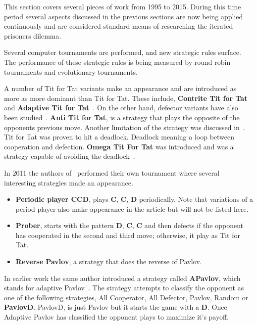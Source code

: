 \documentclass{article}
\begin{document}
This section covers several pieces of work from 1995 to 2015. During this time
period several aspects discussed in the previous sections are now being applied
continuously and are considered standard means of researching the iterated
prisoners dilemma.

Several computer tournaments are performed, and new strategic rules surface.
The performance of these strategic rules is being measured by round robin tournaments
and evolutionary tournaments.
 
A number of Tit for Tat variants make an appearance and are introduced as more
as more dominant than Tit for Tat. These include, \textbf{Contrite Tit for Tat}
\cite{Wu1995} and \textbf{Adaptive Tit for Tat}~\cite{tzafestas-2000a}.
On the other hand, defector variants have also been studied~\cite{Hilde2013}.
\textbf{Anti Tit for Tat}, is a strategy that plays the opposite of the opponents
previous move. Another limitation of the strategy was discussed in~\cite{Wolfgang2006}.
Tit for Tat was proven to hit a deadlock. Deadlock meaning a loop between 
cooperation and defection. \textbf{Omega Tit For Tat} was introduced and was
a strategy capable of avoiding the deadlock~\cite{Wolfgang2006}.

In 2011 the authors of~\cite{Li2011} performed their own tournament where 
several interesting strategies made an appearance.

\begin{itemize}
    \item \textbf{Periodic player CCD}, plays \textbf{C}, \textbf{C}, \textbf{D} 
    periodically. Note that variations of a period player also make appearance
    in the article but will not be listed here.
    \item \textbf{Prober}, starts with the pattern \textbf{D}, \textbf{C}, \textbf{C}
     and then defects if the opponent has cooperated in the second and third move;
     otherwise, it play as Tit for Tat.
    \item \textbf{Reverse Pavlov}, a strategy that does the reverse of Pavlov.
\end{itemize}

In earlier work the same author introduced a strategy called \textbf{APavlov},
which stands for adaptive Pavlov~\cite{Li2007}. The strategy attempts to 
classify the opponent as one of the following strategies, All Cooperator, 
All Defector, Pavlov, Random or \textbf{PavlovD}. PavlovD, is just Pavlov
but it starts the game with a \textbf{D}. Once Adaptive Pavlov has classified
the opponent plays to maximize it's payoff.
\end{document}
